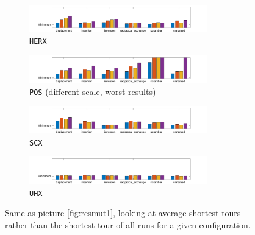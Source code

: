 
\begin{figure}[H]
	\centering
%
	\begin{subfigure}[b]{\textwidth}
		\centering
		\includegraphics[width=0.85\textwidth]{mutation/mean/xedge_heuristic.png}
		\caption{\texttt{HERX}}
		\label{fig:z}
    	\end{subfigure}
	\begin{subfigure}[b]{\textwidth}
		\centering
		\includegraphics[width=0.85\textwidth]{mutation/mean/xposition_based.png}
		\caption{\texttt{POS} (different scale, worst results)}
		\label{fig:z}
    	\end{subfigure}
	\begin{subfigure}[b]{\textwidth}
		\centering
		\includegraphics[width=0.85\textwidth]{mutation/mean/xseq_constructive.png}
		\caption{\texttt{SCX}}
		\label{fig:z}
    	\end{subfigure}
	\begin{subfigure}[b]{\textwidth}
		\centering
		\includegraphics[width=0.85\textwidth]{mutation/mean/xunnamed.png}
		\caption{\texttt{UHX}}
		\label{fig:z}
    	\end{subfigure}
	\caption{Same as picture \ref{fig:resmut1}, looking at average shortest tours rather than the shortest tour of all runs for a given configuration.}
	\label{fig:resmut2}
\end{figure}

